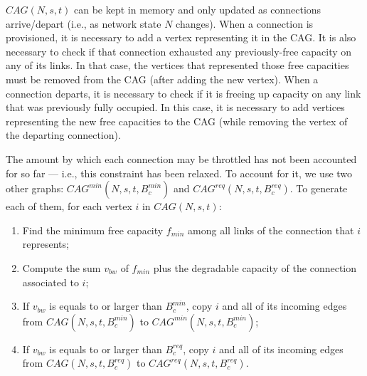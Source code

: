 \documentclass[journal]{IEEEtran}
\begin{document}
$CAG(N, s, t)$ can be kept in memory and only updated as connections arrive/depart (i.e., as network state $N$ changes). When a connection is provisioned, it is necessary to add a vertex representing it in the CAG. It is also necessary to check if that connection exhausted any previously-free capacity on any of its links. In that case, the vertices that represented those free capacities must be removed from the CAG (after adding the new vertex). When a connection departs, it is necessary to check if it is freeing up capacity on any link that was previously fully occupied. In this case, it is necessary to add vertices representing the new free capacities to the CAG (while removing the vertex of the departing connection). %



The amount by which each connection may be throttled has not been accounted for so far --- i.e., this constraint has been relaxed. To account for it, we use two other graphs: $CAG^{min}(N, s, t, B^{min}_{c})$ and $CAG^{req}(N, s, t, B^{req}_{c})$. To generate each of them, for each vertex $i$ in $CAG(N, s, t)$: 
\begin{enumerate}
\item Find the minimum free capacity $f_{min}$ among all links of the connection that $i$ represents;
\item Compute the sum $v_{bw}$ of $f_{min}$ plus the degradable capacity of the connection associated to $i$;
\item If $v_{bw}$ is equals to or larger than $B^{min}_{c}$, copy $i$ and all of its incoming edges from $CAG(N, s, t, B^{min}_{c})$ to $CAG^{min}(N, s, t, B^{min}_{c})$;
\item If $v_{bw}$ is equals to or larger than $B^{req}_{c}$, copy $i$ and all of its incoming edges from $CAG(N, s, t, B^{req}_{c})$ to $CAG^{req}(N, s, t, B^{req}_{c})$.
\end{enumerate}
\end{document}
